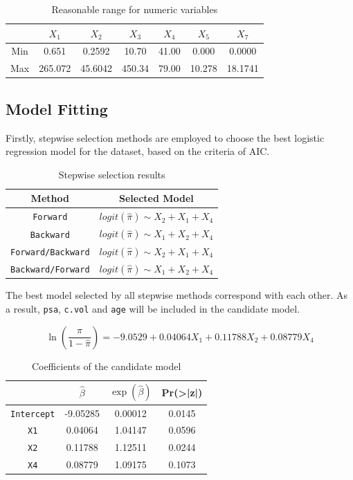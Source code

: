 \documentclass[a4paper,11pt,onecolumn,twoside]{article}
\begin{document}
\begin{table}[H]
	\centering
	\begin{tabular}{ccccccc}
		\midrule[1.5pt]
		& $X_{1}$&$X_{2}$&$X_{3}$&$X_{4}$&$X_{5}$&$X_{7}$\\
		\hline
		Min &0.651   & 0.2592  & 10.70  &41.00  & 0.000 &0.0000\\
		Max &265.072  &45.6042 &450.34  &79.00  &10.278  &18.1741\\ 
		\midrule[1.5pt]
	\end{tabular}
	\caption{Reasonable range for numeric variables}
\end{table}
\subsection{Model Fitting}
Firstly, stepwise selection methods are employed to choose the best logistic regression model for the dataset, based on the criteria of AIC.\par
\begin{table}[H]
	\centering
	\begin{tabular}{cc}
		\midrule[1.5pt]
		Method&Selected Model\\
		\hline
		\texttt{Forward}&$logit(\hat{\pi}) \sim X_2 + X_1 + X_4$\\
		\texttt{Backward} &$logit(\hat{\pi}) \sim X_1 + X_2 + X_4$\\
		\texttt{Forward/Backward} &$logit(\hat{\pi}) \sim X_2 + X_1 + X_4$\\
		\texttt{Backward/Forward} &$logit(\hat{\pi}) \sim X_1 + X_2 + X_4$\\
		\midrule[1.5pt]
	\end{tabular}
	\caption{Stepwise selection results}
\end{table}
The best model selected by all stepwise methods correspond with each other. As a result, \texttt{psa}, \texttt{c.vol} and \texttt{age} will be included in the candidate model.\par
\begin{equation}
\ln\left(\frac{\hat{\pi}}{1-\hat{\pi}}\right)=-9.0529+0.04064X_{1}+0.11788X_{2}+0.08779X_{4}
\end{equation}
\begin{table}[H]
	\centering
	\begin{tabular}{cccc}
		\midrule[1.5pt]
		&$\hat{\beta}$&$\exp(\hat{\beta})$&Pr(>|z|)\\
		\hline 
		\texttt{Intercept} &-9.05285&0.00012&0.0145 \\ 
		\texttt{X1} &0.04064 & 1.04147&0.0596\\ 
		\texttt{X2} &0.11788 &1.12511&0.0244\\
		\texttt{X4} &0.08779 &1.09175&0.1073\\ 
		\midrule[1.5pt]
	\end{tabular}
	\caption{Coefficients of the candidate model}
\end{table}
\end{document}
